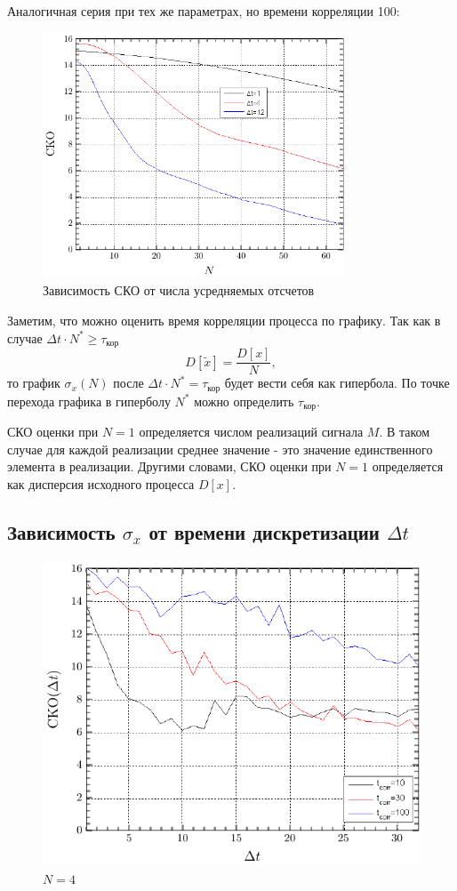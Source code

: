 \documentclass[a4paper,14pt]{extarticle}
\begin{document}
\newpage
Аналогичная серия при тех же параметрах, но времени корреляции 100:
\begin{figure}[H]
    \centering
    \includegraphics[width=0.8\textwidth]{fig/sko_t100.pdf}
    \caption{Зависимость СКО от числа усредняемых отсчетов}
    \label{fig:sko_from_n_t100}
\end{figure}
Заметим, что можно оценить время корреляции процесса по графику. Так как в случае $\Delta t \cdot N^* \ge \tau_\text{кор}$ 
\begin{equation}
    D[\tilde{x}] = \frac{D[x]}{N},
\end{equation}
то график $\sigma_x(N)$ после $\Delta t \cdot N^* = \tau_\text{кор}$ будет вести себя как гипербола. По точке перехода графика в гиперболу $N^*$ можно определить $\tau_\text{кор}$.

СКО оценки при $N=1$ определяется числом реализаций сигнала $M$. В таком случае для каждой реализации среднее значение - это значение единственного элемента в реализации. Другими словами, СКО оценки при $N=1$ определяется как дисперсия исходного процесса $D[x]$.



\subsection{Зависимость $\sigma_x$ от времени дискретизации $\Delta t$}

\begin{figure}[H]
    \centering
    \includegraphics[width=0.7\linewidth]{fig/sko_n4.pdf}
    \vspace{-0.7em}
    \caption{$N=4$}
    \label{fig:sko_n4}
\end{figure}
\end{document}
